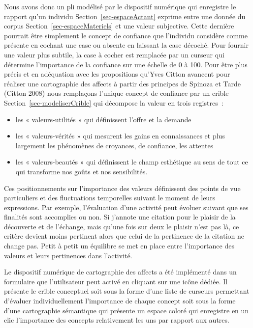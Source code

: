 \documentclass[
  letterpaper,
  DIV=11,
  numbers=noendperiod]{scrreprt}
\begin{document}
Nous avons donc un pli modélisé par le dispositif numérique qui
enregistre le rapport qu'un individu Section~\ref{sec-espaceActant}
exprime entre une donnée du corpus Section~\ref{sec-espaceMateriels} et
une valeur subjective. Cette dernière pourrait être simplement le
concept de confiance que l'individu considère comme présente en cochant
une case ou absente en laissant la case décoché. Pour fournir une valeur
plus subtile, la case à cocher est remplacée par un curseur qui
détermine l'importance de la confiance sur une échelle de 0 à 100. Pour
être plus précis et en adéquation avec les propositions qu'Yves Citton
avancent pour réaliser une cartographie des affects à partir des
principes de Spinoza et Tarde (Citton 2008) nous remplaçons l'unique
concept de confiance par un crible Section~\ref{sec-modeliserCrible} qui
décompose la valeur en trois registres~:

\begin{itemize}
\item
  les « valeurs-utilités » qui définissent l'offre et la demande
\item
  les « valeurs-vérités » qui mesurent les gains en connaissances et
  plus largement les phénomènes de croyances, de confiance, les attentes
\item
  les « valeurs-beautés » qui définissent le champ esthétique au sens de
  tout ce qui transforme nos goûts et nos sensibilités.
\end{itemize}

Ces positionnements sur l'importance des valeurs définissent des points
de vue particuliers et des fluctuations temporelles suivant le moment de
leurs expressions. Par exemple, l'évaluation d'une activité peut évoluer
suivant que ses finalités sont accomplies ou non. Si j'annote une
citation pour le plaisir de la découverte et de l'échange, mais qu'une
fois sur deux le plaisir n'est pas là, ce critère devient moins
pertinent alors que celui de la pertinence de la citation ne change pas.
Petit à petit un équilibre se met en place entre l'importance des
valeurs et leurs pertinences dans l'activité.

Le dispositif numérique de cartographie des affects a été implémenté
dans un formulaire que l'utilisateur peut activé en cliquant sur une
icône dédiée. Il présente le crible conceptuel soit sous la forme d'une
liste de curseurs permettant d'évaluer individuellement l'importance de
chaque concept soit sous la forme d'une cartographie sémantique qui
présente un espace coloré qui enregistre en un clic l'importance des
concepts relativement les uns par rapport aux autres.
\end{document}
